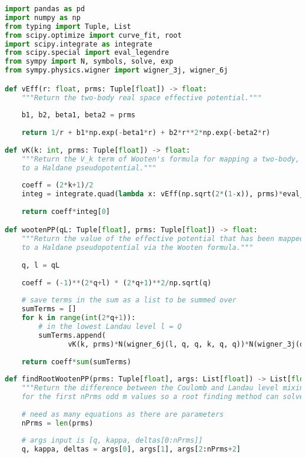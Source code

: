 \doublespacing

\begin{lstlisting}[language=Python]
import pandas as pd
import numpy as np
from typing import Tuple, List
from scipy.optimize import curve_fit, root
import scipy.integrate as integrate
from scipy.special import eval_legendre
from sympy import N, symbols, solve, exp
from sympy.physics.wigner import wigner_3j, wigner_6j

def vEff(r: float, prms: Tuple[float]) -> float:
    """Return the two-body real space effective potential."""
    
    b1, b2, beta1, beta2 = prms
    
    return 1/r + b1*np.exp(-beta1*r) + b2*r**2*np.exp(-beta2*r)
    
def vK(k: int, prms: Tuple[float]) -> float:
    """Return the V_k term of Wooten's formula for mapping a two-body, real space effective potential
    to a Haldane pseudopotential."""
    
    coeff = (2*k+1)/2
    integ = integrate.quad(lambda x: vEff(np.sqrt(2*(1-x)), prms)*eval_legendre(k, x), -1, 1)
    
    return coeff*integ[0]

def wootenPP(qL: Tuple[float], prms: Tuple[float]) -> float:
    """Return the value of the effective potential that has been mapped
    to a Haldane pseudopotential via the Wooten formula."""
    
    q, l = qL
    
    coeff = (-1)**(2*q+l) * (2*q+1)**2/np.sqrt(q)
    
    # save terms in the sum as a list to be summed over
    sumTerms = []
    for k in range(int(2*q+1)):
        # in the lowest Landau level l = Q
        sumTerms.append(
               vK(k, prms)*N(wigner_6j(l, q, q, k, q, q))*N(wigner_3j(q, k, q, -q, 0, q))**2)
    
    return coeff*sum(sumTerms)
    
def findRootWootenPP(prms: Tuple[float], args: List[float]) -> List[float]:
    """Return the difference between the Coulomb and Landau level mixing-incorporated Haldane pseudopotentials
    for the first nPrms odd m values so a root finding method can solve for the fitting parameters."""
    
    # need as many equations as there are parameters
    nPrms = len(prms)
    
    # args input is [q, kappa, deltas[0:nPrms]]
    q, kappa, deltas = args[0], args[1], args[2:nPrms+2]


\end{lstlisting}
